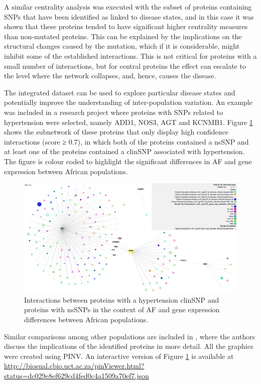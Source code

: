 A similar centrality analysis was executed with the subset of proteins containing SNPs that have been identified as linked to disease states, and in this case it was shown that these proteins tended to have significant higher centrality measures than non-mutated proteins. This can be explained by the implications on the structural changes caused by the mutation, which if it is considerable, might inhibit some of the established interactions. This is not critical for proteins with a small number of interactions, but for central proteins the effect can escalate to the level where the network collapses, and, hence, causes the disease.

The integrated dataset can be used to explore particular disease states and potentially improve the understanding of inter-population variation. An example was included in a research project where proteins with SNPs related to hypertension were selected, namely ADD1, NOS3, AGT and KCNMB1. Figure \ref{fig:pinv_human_snps} shows the subnetwork of these proteins that only display high confidence interactions (score ≥ 0.7), in which both of the proteins contained a nsSNP and at least one of the proteins contained a clinSNP  associated with hypertension. The figure is colour coded to highlight the significant differences in AF and gene expression between African populations. 

\begin{figure}
\centering
\includegraphics[width=\textwidth]{figures/pinv_human_snps.png}
\caption[Interactions between proteins with a hypertension clinSNP]{Interactions between proteins with a hypertension clinSNP and proteins with nsSNPs in the context of AF and gene expression differences between African populations.
\label{fig:pinv_human_snps}}
\end{figure}

Similar comparisons among other populations are included in \cite{HEE2014}, where the authors discuss the implications of the identified proteins in more detail. All the graphics were created using PINV. An interactive version of Figure \ref{fig:pinv_human_snps} is available at \url{http://biosual.cbio.uct.ac.za/pinViewer.html?status=dc029e8ef629cd4fed0c4a1509a70ef7.json}

